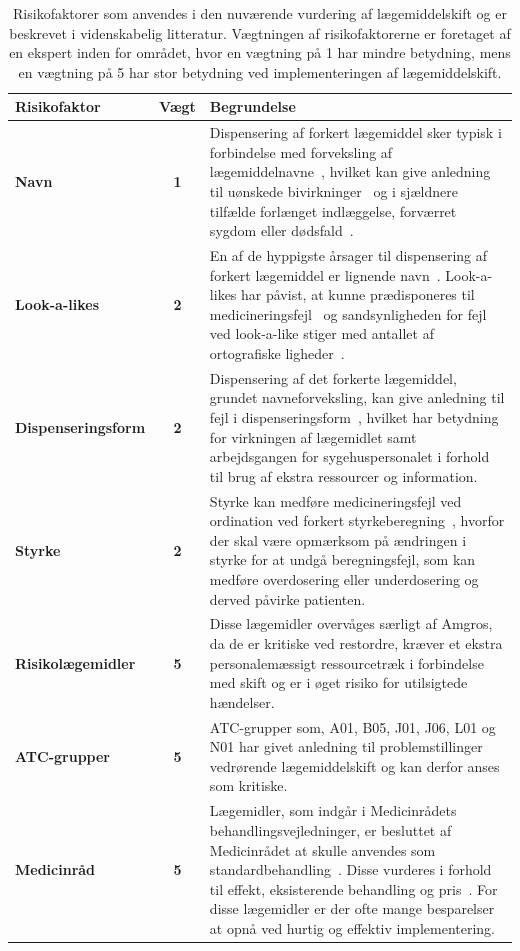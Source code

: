 \begin{longtable}{|l|c|p{9.2cm}|}
	\caption{Risikofaktorer som anvendes i den nuværende vurdering af lægemiddelskift og er beskrevet i videnskabelig litteratur. Vægtningen af risikofaktorerne er foretaget af en ekspert inden for området, hvor en vægtning på 1 har mindre betydning, mens en vægtning på 5 har stor betydning ved implementeringen af lægemiddelskift.} 
	\label{table:features} \\ \hline
\cellcolor[HTML]{C0C0C0} {\textbf{Risikofaktor}} & \cellcolor[HTML]{C0C0C0} {\textbf{Vægt}} & \cellcolor[HTML]{C0C0C0} {\textbf{Begrundelse}} \vspace{0.2cm} \\ \hline
\textbf{Navn} & \textbf{1} & Dispensering af forkert lægemiddel sker typisk i forbindelse med forveksling af lægemiddelnavne~\citep{DanskSelskabforPatientsikkerhed2009}, hvilket kan give anledning til uønskede bivirkninger~\citep{Basco2010} og i sjældnere tilfælde forlænget indlæggelse, forværret sygdom eller dødsfald~\citep{DanskSelskabforPatientsikkerhed2009}.  \\  \hline 
\textbf{Look-a-likes} & \textbf{2} & En af de hyppigste årsager til dispensering af forkert lægemiddel er lignende navn~\citep{Hakonsen2010}. Look-a-likes har påvist, at kunne prædisponeres til medicineringsfejl~\citep{Wittich2014} og sandsynligheden for fejl ved look-a-like stiger med antallet af ortografiske ligheder~\citep{Basco2010}. \\  \hline 
\textbf{Dispenseringsform} & \textbf{2} & Dispensering af det forkerte lægemiddel, grundet navneforveksling, kan give anledning til fejl i dispenseringsform~\citep{DanskSelskabforPatientsikkerhed2009, Agrawal2009}, hvilket har betydning for virkningen af lægemidlet samt arbejdsgangen for sygehuspersonalet i forhold til brug af ekstra ressourcer og information.
\\ \hline 
\textbf{Styrke} & \textbf{2} & Styrke kan medføre medicineringsfejl ved ordination ved forkert styrkeberegning~\citep{Agrawal2009}, hvorfor der skal være opmærksom på ændringen i styrke for at undgå beregningsfejl, som kan medføre overdosering eller underdosering og derved påvirke patienten.\\ \hline
\textbf{Risikolægemidler} & \textbf{5} & Disse lægemidler overvåges særligt af Amgros, da de er kritiske ved restordre, kræver et ekstra personalemæssigt ressourcetræk i forbindelse med skift og er i øget risiko for utilsigtede hændelser.~\citep{Amgros} \\ \hline 
\textbf{ATC-grupper} & \textbf{5} & ATC-grupper som, A01, B05, J01, J06, L01 og N01 har givet anledning til problemstillinger vedrørende lægemiddelskift og kan derfor anses som kritiske. \citep{SRN} \\ \hline 
\textbf{Medicinråd} & \textbf{5} & Lægemidler, som indgår i Medicinrådets behandlingsvejledninger, er besluttet af Medicinrådet at skulle anvendes som standardbehandling~\citep{Medicinradet2018}. Disse vurderes i forhold til effekt, eksisterende behandling og pris~\citep{Medicinradet2018}. For disse lægemidler er der ofte mange besparelser at opnå ved hurtig og effektiv implementering.\\ \hline 
    \end{longtable}

